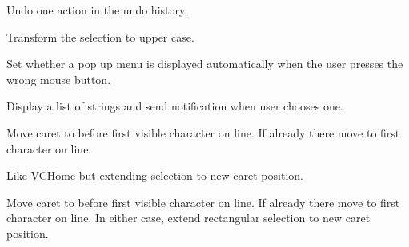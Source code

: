 
Undo one action in the undo history.


\label{wxstyledtextctrluppercase}


Transform the selection to upper case.


\label{wxstyledtextctrlusepopup}


Set whether a pop up menu is displayed automatically when the user presses
the wrong mouse button.


\label{wxstyledtextctrluserlistshow}


Display a list of strings and send notification when user chooses one.


\label{wxstyledtextctrlvchome}


Move caret to before first visible character on line.
If already there move to first character on line.


\label{wxstyledtextctrlvchomeextend}


Like VCHome but extending selection to new caret position.


\label{wxstyledtextctrlvchomerectextend}


Move caret to before first visible character on line.
If already there move to first character on line.
In either case, extend rectangular selection to new caret position.


\label{wxstyledtextctrlvchomewrap}



\label{wxstyledtextctrlvchomewrapextend}



\label{wxstyledtextctrlvisiblefromdocline}

